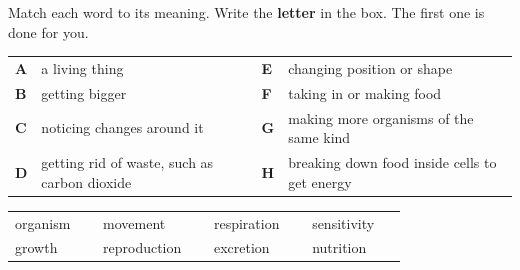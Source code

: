 \documentclass[12pt,a4paper]{article}
\newcommand{\nbox}{\ \fbox{\rule{0pt}{1.05em}\rule{1.0em}{0pt}}\ }
\newcommand{\fbx}[1]{\ \fbox{\makebox[1.0em]{\rule{0pt}{1.05em}\color{cbteal}\bfseries #1}}\ }
\begin{document}
\noindent\begin{minipage}{\textwidth}
\noindent Match each word to its meaning. Write the \textbf{letter} in the box. The
first one is done for you.

\vspace{6pt}
\begin{tcolorbox}[enhanced, colback=white, colframe=rulegray, boxrule=0.6pt, arc=5pt,
                  left=8pt, right=8pt, top=4pt, bottom=4pt]
  \renewcommand{\arraystretch}{1.12}%
  \begin{tabularx}{\linewidth}{@{}p{0.45cm}L p{0.45cm}L@{}}
    \textbf{A} & a living thing &
    \textbf{E} & changing position or shape \\
    \textbf{B} & getting bigger &
    \textbf{F} & taking in or making food \\
    \textbf{C} & noticing changes around it &
    \textbf{G} & making more organisms of the same kind \\
    \textbf{D} & getting rid of waste, such as carbon dioxide &
    \textbf{H} & breaking down food inside cells to get energy \\
  \end{tabularx}
\end{tcolorbox}

\vspace{4pt}
{\renewcommand{\arraystretch}{1.6}%
\noindent\begin{tabularx}{\textwidth}{@{}L L L L@{}}
  organism \fbx{A} & movement \nbox & respiration \nbox & sensitivity \nbox \\
  growth \nbox & reproduction \nbox & excretion \nbox & nutrition \nbox \\
\end{tabularx}}
\end{minipage}

\end{document}
